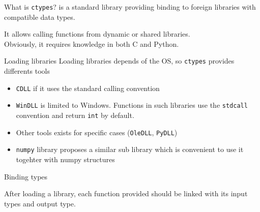 \begin{frame}{What is \texttt{ctypes}?}
     is a standard library providing binding to foreign libraries with compatible data types.
    
    It allows calling functions from dynamic or shared libraries.\\

    Obviously, it requires knowledge in both C and Python.

\end{frame}

\begin{frame}{Loading libraries}
    Loading libraries depends of the OS, so \texttt{ctypes} provides differents tools
    \begin{itemize}
        \item \texttt{CDLL} if it uses the standard calling convention
        \item \texttt{WinDLL} is limited to Windows. Functions in such libraries use the \texttt{stdcall} convention and return \texttt{int} by default.
        \item Other tools exists for specific cases (\texttt{OleDLL}, \texttt{PyDLL})
        \item \texttt{numpy} library proposes a similar sub library which is convenient to use it togehter with numpy structures
    \end{itemize}

\end{frame}

\begin{frame}{Binding types}

    After loading a library, each function provided should be linked with its input types and output type.

\end{frame}